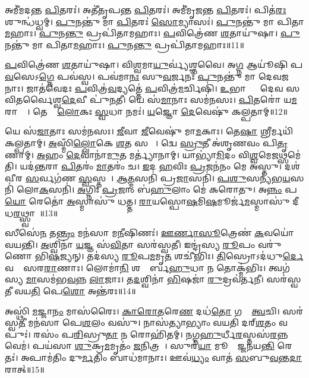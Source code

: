 𑌅𑌮𑍀॑𑌮𑌦𑌨𑍍𑌤 \ul{𑌪𑌿}𑌤𑌰𑌃॑।
𑌅𑌤𑍀॑𑌤𑍃𑌪𑌨𑍍𑌤 \ul{𑌪𑌿}𑌤𑌰𑌃॑।
𑌅𑌮𑍀॑𑌮𑍃𑌜𑌨𑍍𑌤 \ul{𑌪𑌿}𑌤𑌰𑌃॑।
𑌪𑌿𑌤॑\ul{𑌰𑌃} 𑌶𑍁𑌨𑍍𑌧॑𑌧𑍍𑌵𑌮𑍍।
\ul{𑌪𑍁}𑌨𑌨𑍍𑌤𑍁॑ 𑌮𑌾 \ul{𑌪𑌿}𑌤𑌰𑌃॑ \ul{𑌸𑍋}𑌮𑍍𑌯𑌾𑌸𑌃॑।
\ul{𑌪𑍁}𑌨𑌨𑍍𑌤𑍁॑ 𑌮𑌾 𑌪𑌿𑌤𑌾\ul{𑌮}𑌹𑌾𑌃।
\ul{𑌪𑍁}𑌨\ul{𑌨𑍍𑌤𑍁} 𑌪𑍍𑌰𑌪𑌿॑𑌤𑌾𑌮𑌹𑌾𑌃।
\ul{𑌪}𑌵𑌿𑌤𑍍𑌰𑍇॑𑌣 \ul{𑌶}𑌤𑌾𑌯𑍁॑𑌷𑌾।
\ul{𑌪𑍁}𑌨𑌨𑍍𑌤𑍁॑ 𑌮𑌾 𑌪𑌿𑌤𑌾\ul{𑌮}𑌹𑌾𑌃।
\ul{𑌪𑍁}𑌨\ul{𑌨𑍍𑌤𑍁} 𑌪𑍍𑌰𑌪𑌿॑𑌤𑌾𑌮𑌹𑌾𑌃॥11॥

\ul{𑌪}𑌵𑌿𑌤𑍍𑌰𑍇॑𑌣 \ul{𑌶}𑌤𑌾𑌯𑍁॑𑌷𑌾।
𑌵𑌿\ul{𑌶𑍍𑌵}𑌮𑌾\ul{𑌯𑍁}𑌰𑍍𑌵𑍍𑌯॑𑌶𑍍𑌞𑌵𑍈।
𑌅\ul{𑌗𑍍𑌨} 𑌆𑌯𑍂॑𑌷𑌿 𑌪\ul{𑌵}𑌸𑍇\-𑌽\ul{𑌗𑍍𑌨𑍇} 𑌪𑌵॑𑌸𑍍𑌵।
𑌪𑌵॑𑌮𑌾\ul{𑌨𑌃} 𑌸𑍁\ul{𑌵}𑌰𑍍𑌜𑌨𑌃॑ \ul{𑌪𑍁}𑌨𑌨𑍍𑌤𑍁॑ 𑌮𑌾 𑌦𑍇𑌵\ul{𑌜}𑌨𑌾𑌃।
𑌜𑌾𑌤॑𑌵𑍇𑌦𑌃 \ul{𑌪}𑌵𑌿𑌤𑍍𑌰॑\ul{𑌵}𑌦𑍍𑌯𑌤𑍍𑌤𑍇॑ \ul{𑌪}𑌵𑌿𑌤𑍍𑌰॑\ul{𑌮}𑌰𑍍𑌚𑌿𑌷𑌿॑।
\ul{𑌉}𑌭𑌾𑌭𑍍𑌯𑌾𑌂᳚ 𑌦𑍇𑌵 𑌸𑌵𑌿𑌤𑌰𑍍𑌵𑍈𑌶𑍍𑌵\ul{𑌦𑍇}𑌵𑍀 𑌪𑍁॑\ul{𑌨}𑌤𑍀।
𑌯𑍇 𑌸॑\ul{𑌮𑌾}𑌨𑌾𑌃 𑌸𑌮॑𑌨𑌸𑌃।
\ul{𑌪𑌿}𑌤𑌰𑍋॑ 𑌯\ul{𑌮}𑌰𑌾𑌜𑍍𑌯𑍇᳚।
𑌤𑍇𑌷𑌾𑌂᳚ \ul{𑌲𑍋}𑌕𑌃 \ul{𑌸𑍍𑌵}𑌧𑌾 𑌨𑌮𑌃॑।
\ul{𑌯}𑌜𑍍𑌞𑍋 \ul{𑌦𑍇}𑌵𑍇𑌷𑍁॑ 𑌕𑌲𑍍𑌪𑌤𑌾𑌮𑍍॥12॥

𑌯𑍇 𑌸॑\ul{𑌜𑌾}𑌤𑌾𑌃 𑌸𑌮॑𑌨𑌸𑌃।
\ul{𑌜𑍀}𑌵𑌾 \ul{𑌜𑍀}𑌵𑍇𑌷𑍁॑ 𑌮𑌾\ul{𑌮}𑌕𑌾𑌃।
𑌤𑍇\ul{𑌷𑌾}\ul{} 𑌶𑍍𑌰𑍀𑌰𑍍𑌮𑌯𑌿॑ 𑌕𑌲𑍍𑌪𑌤𑌾𑌮𑍍।
\ul{𑌅}𑌸𑍍𑌮𑌿𑌁\ul{𑌲𑍍𑌲𑍋}𑌕𑍇 \ul{𑌶}𑌤 𑌸𑌮𑌾𑌃᳚।
𑌦𑍍𑌵𑍇 \ul{𑌸𑍍𑌰𑍁}𑌤𑍀 𑌅॑𑌶𑍃𑌣𑌵𑌂 𑌪𑌿\ul{𑌤𑍃}𑌣𑌾𑌮𑍍।
\ul{𑌅}𑌹𑌂 \ul{𑌦𑍇}𑌵𑌾𑌨𑌾॑\ul{𑌮𑍁}𑌤 𑌮𑌰𑍍𑌤𑍍𑌯𑌾॑𑌨𑌾𑌮𑍍।
𑌯𑌾𑌭𑍍𑌯𑌾॑\ul{𑌮𑌿}𑌦𑌂 𑌵𑌿\ul{𑌶𑍍𑌵}𑌮𑍇\ul{𑌜}𑌥𑍍𑌸𑌮𑍇॑𑌤𑌿।
𑌯𑌦॑\ul{𑌨𑍍𑌤}𑌰𑌾 \ul{𑌪𑌿}𑌤𑌰𑌂॑ \ul{𑌮𑌾}𑌤𑌰𑌂॑ 𑌚।
\ul{𑌇}𑌦 \ul{𑌹}𑌵𑌿𑌃 \ul{𑌪𑍍𑌰}𑌜𑌨॑𑌨𑌂 𑌮𑍇 𑌅𑌸𑍍𑌤𑍁।
𑌦𑌶॑𑌵𑍀𑌰 \ul{𑌸}𑌰𑍍𑌵𑌗॑𑌣 \ul{𑌸𑍍𑌵}𑌸𑍍𑌤𑌯𑍇᳚।
\ul{𑌆}\ul{𑌤𑍍𑌮}𑌸𑌨𑌿॑ 𑌪𑍍𑌰\ul{𑌜𑌾}𑌸𑌨𑌿॑।
\ul{𑌪}\ul{𑌶𑍁}𑌸𑌨𑍍𑌯॑𑌭\ul{𑌯}𑌸𑌨𑌿॑ 𑌲𑍋\ul{𑌕}𑌸𑌨𑌿॑।
\ul{𑌅}𑌗𑍍𑌨𑌿𑌃 \ul{𑌪𑍍𑌰}𑌜𑌾𑌂 𑌬॑\ul{𑌹𑍁}𑌲𑌾𑌂 𑌮𑍇॑ 𑌕𑌰𑍋𑌤𑍁।
𑌅\ul{𑌨𑍍𑌨𑌂} 𑌪\ul{𑌯𑍋} 𑌰𑍇𑌤𑍋॑ \ul{𑌅}𑌸𑍍𑌮𑌾𑌸𑍁॑ 𑌧𑌤𑍍𑌤।
\ul{𑌰𑌾}𑌯𑌸𑍍𑌪𑍋\ul{𑌷}𑌮𑌿\ul{𑌷}𑌮𑍂𑌰𑍍𑌜॑\ul{𑌮}𑌸𑍍𑌮𑌾𑌸𑍁॑ 𑌦𑍀𑌧\ul{𑌰}𑌥𑍍𑌸𑍍𑌵𑌾𑌹𑌾᳚॥13॥\anuvakamend[\ul{𑌇}\ul{𑌨𑍍𑌦𑍍𑌰𑌿}𑌯𑌾𑌯॑ \ul{𑌪𑌿}𑌤𑌰𑌃॑ \ul{𑌶}𑌤𑌾𑌯𑍁॑𑌷𑌾 \ul{𑌪𑍁}𑌨𑌨𑍍𑌤𑍁॑ 𑌮𑌾 𑌪𑌿𑌤𑌾\ul{𑌮}𑌹𑌾𑌃 \ul{𑌪𑍁}𑌨\ul{𑌨𑍍𑌤𑍁} 𑌪𑍍𑌰𑌪𑌿॑𑌤𑌾𑌮𑌹𑌾𑌃 𑌕𑌲𑍍𑌪𑌤𑌾\dng{ꣴ} \ul{𑌸𑍍𑌵}𑌸𑍍𑌤\ul{𑌯𑍇} 𑌪𑌞𑍍𑌚॑ 𑌚]

𑌸𑍀𑌸𑍇॑\ul{𑌨} 𑌤\ul{𑌨𑍍𑌤𑍍𑌰𑌂} 𑌮𑌨॑𑌸𑌾 𑌮\ul{𑌨𑍀}𑌷𑌿𑌣𑌃॑।
\ul{𑌊}\ul{𑌰𑍍𑌣𑌾}\ul{𑌸𑍂}𑌤𑍍𑌰𑍇𑌣॑ \ul{𑌕}𑌵𑌯𑍋॑ 𑌵𑌯𑌨𑍍𑌤𑌿।
\ul{𑌅}𑌶𑍍𑌵𑌿𑌨𑌾॑ \ul{𑌯}𑌜𑍍𑌞 𑌸॑\ul{𑌵𑌿}𑌤𑌾 𑌸𑌰॑𑌸𑍍𑌵𑌤𑍀।
𑌇𑌨𑍍𑌦𑍍𑌰॑𑌸𑍍𑌯 \ul{𑌰𑍂}𑌪𑌂 𑌵𑌰𑍁॑𑌣𑍋 𑌭𑌿\ul{𑌷}𑌜𑍍𑌯𑌨𑍍।
𑌤𑌦॑𑌸𑍍𑌯 \ul{𑌰𑍂}𑌪\ul{𑌮}𑌮𑍃\ul{𑌤}\ul{} 𑌶𑌚𑍀॑𑌭𑌿𑌃।
\ul{𑌤𑌿}𑌸𑍍𑌰𑍋\-𑌽𑌦॑𑌧𑍁\ul{𑌰𑍍𑌦𑍇}𑌵𑌤𑌾𑌃᳚ 𑌸𑌰\ul{𑌰𑌾}𑌣𑌾𑌃।
𑌲𑍋𑌮𑌾॑\ul{𑌨𑌿} 𑌶𑌷𑍍𑌪𑍈᳚𑌰𑍍𑌬\ul{𑌹𑍁}𑌧𑌾 𑌨 𑌤𑍋𑌕𑍍𑌮॑𑌭𑌿𑌃।
𑌤𑍍𑌵𑌗॑𑌸𑍍𑌯 \ul{𑌮𑌾}\ul{}𑌸𑌮॑𑌭\ul{𑌵}𑌨𑍍𑌨 \ul{𑌲𑌾}𑌜𑌾𑌃।
𑌤\ul{𑌦}𑌶𑍍𑌵𑌿𑌨𑌾॑ \ul{𑌭𑌿}𑌷𑌜𑌾॑ \ul{𑌰𑍁}𑌦𑍍𑌰𑌵॑𑌰𑍍𑌤𑌨𑍀।
𑌸𑌰॑𑌸𑍍𑌵𑌤𑍀 𑌵𑌯\ul{𑌤𑌿} 𑌪𑍇\ul{𑌶𑍋} 𑌅𑌨𑍍𑌤॑𑌰𑌃॥14॥

𑌅𑌸𑍍𑌥𑌿॑ \ul{𑌮}𑌜𑍍𑌜𑌾\ul{𑌨𑌂} 𑌮𑌾𑌸॑𑌰𑍈𑌃।
\ul{𑌕𑌾}\ul{𑌰𑍋}\ul{𑌤}𑌰𑍇\ul{𑌣} 𑌦𑌧॑\ul{𑌤𑍋} 𑌗𑌵𑌾𑌂᳚ \ul{𑌤𑍍𑌵}𑌚𑌿।
𑌸𑌰॑𑌸𑍍𑌵\ul{𑌤𑍀} 𑌮𑌨॑𑌸𑌾 𑌪𑍇\ul{𑌶}𑌲𑌂 𑌵𑌸𑍁॑।
𑌨𑌾𑌸॑𑌤𑍍𑌯𑌾𑌭𑍍𑌯𑌾𑌂 𑌵𑌯𑌤𑌿 𑌦𑌰𑍍‌\mbox{}\ul{𑌶}𑌤𑌂 𑌵𑌪𑍁𑌃॑।
𑌰𑌸𑌂॑ 𑌪\ul{𑌰𑌿}𑌸𑍍𑌰𑍁\ul{𑌤𑌾} 𑌨 𑌰𑍋𑌹𑌿॑𑌤𑌮𑍍।
\ul{𑌨}𑌗𑍍𑌨\ul{𑌹𑍁}𑌰𑍍𑌧𑍀\ul{𑌰}𑌸𑍍𑌤𑌸॑\ul{𑌰}𑌨𑍍𑌨 𑌵𑍇𑌮॑।
𑌪𑌯॑𑌸𑌾 \ul{𑌶𑍁}𑌕𑍍𑌰\ul{𑌮}𑌮𑍃𑌤𑌂॑ \ul{𑌜}𑌨𑌿𑌤𑍍𑌰𑌮𑍍᳚।
𑌸𑍁𑌰॑\ul{𑌯𑌾} 𑌮𑍂𑌤𑍍𑌰𑌾᳚𑌜𑍍𑌜𑌨𑌯\ul{𑌨𑍍𑌤𑌿} 𑌰𑍇𑌤𑌃॑।
𑌅𑌪𑌾𑌮॑𑌤𑌿𑌂 𑌦𑍁\ul{𑌰𑍍𑌮}𑌤𑌿𑌂 𑌬𑌾𑌧॑𑌮𑌾𑌨𑌾𑌃।
𑌊𑌵॑\ul{𑌧𑍍𑌯𑌂} 𑌵𑌾𑌤॑ \ul{𑌸}𑌬𑍁\ul{𑌵}𑌨𑍍𑌤\ul{𑌦𑌾}𑌰𑌾𑌤𑍍॥15॥

